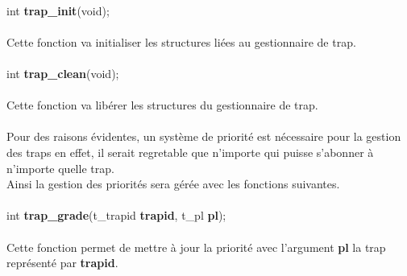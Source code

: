 \documentclass[10pt,a4wide]{article}
\begin{document}
\paragraph{}

\hspace{1.5cm}int \textbf{trap\_init}(void);

\paragraph{}

Cette fonction va initialiser les structures li\'ees au gestionnaire de trap.

\paragraph{}

\hspace{1.5cm}int \textbf{trap\_clean}(void);

\paragraph{}

Cette fonction va lib\'erer les structures du gestionnaire de trap.

\paragraph{}

Pour des raisons \'evidentes, un syst\`eme de priorit\'e est n\'ecessaire pour la gestion des traps en effet,
il serait regretable que n'importe qui puisse s'abonner \`a n'importe quelle trap.\\
Ainsi la gestion des priorit\'es sera g\'er\'ee avec les fonctions suivantes.

\paragraph{}

\hspace{1.5cm}int \textbf{trap\_grade}(t\_trapid \textbf{trapid},
                                       t\_pl \textbf{pl});

\paragraph{}

Cette fonction permet de mettre \`a jour la priorit\'e avec l'argument \textbf{pl} la trap repr\'esent\'e par
\textbf{trapid}.
\end{document}
